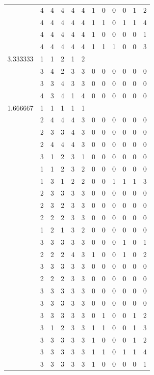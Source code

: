 \documentclass[]{book}
\theoremstyle{definition}
\theoremstyle{definition}
\theoremstyle{definition}
\theoremstyle{remark}
\begin{document}
\begin{table}
{\begin{tabular}[t]{rrrrrrrrrrrr}
 & 4 & 4 & 4 & 4 & 4 & 1 & 0 & 0 & 0 & 1 & 2\\
 & 4 & 4 & 4 & 4 & 4 & 1 & 1 & 0 & 1 & 1 & 4\\
 & 4 & 4 & 4 & 4 & 4 & 1 & 0 & 0 & 0 & 0 & 1\\
 & 4 & 4 & 4 & 4 & 4 & 1 & 1 & 1 & 0 & 0 & 3\\
3.333333 & 1 & 1 & 2 & 1 & 2 &  &  &  &  &  & \\
 & 3 & 4 & 2 & 3 & 3 & 0 & 0 & 0 & 0 & 0 & 0\\
 & 3 & 3 & 4 & 3 & 3 & 0 & 0 & 0 & 0 & 0 & 0\\
 & 4 & 3 & 4 & 1 & 4 & 0 & 0 & 0 & 0 & 0 & 0\\
1.666667 & 1 & 1 & 1 & 1 & 1 &  &  &  &  &  & \\
 & 2 & 4 & 4 & 4 & 3 & 0 & 0 & 0 & 0 & 0 & 0\\
 & 2 & 3 & 3 & 4 & 3 & 0 & 0 & 0 & 0 & 0 & 0\\
 & 2 & 4 & 4 & 4 & 3 & 0 & 0 & 0 & 0 & 0 & 0\\
 & 3 & 1 & 2 & 3 & 1 & 0 & 0 & 0 & 0 & 0 & 0\\
 & 1 & 1 & 2 & 3 & 2 & 0 & 0 & 0 & 0 & 0 & 0\\
 & 1 & 3 & 1 & 2 & 2 & 0 & 0 & 1 & 1 & 1 & 3\\
 & 2 & 3 & 3 & 3 & 3 & 0 & 0 & 0 & 0 & 0 & 0\\
 & 2 & 3 & 2 & 3 & 3 & 0 & 0 & 0 & 0 & 0 & 0\\
 & 2 & 2 & 2 & 3 & 3 & 0 & 0 & 0 & 0 & 0 & 0\\
 & 1 & 2 & 1 & 3 & 2 & 0 & 0 & 0 & 0 & 0 & 0\\
 & 3 & 3 & 3 & 3 & 3 & 0 & 0 & 0 & 1 & 0 & 1\\
 & 2 & 2 & 2 & 4 & 3 & 1 & 0 & 0 & 1 & 0 & 2\\
 & 3 & 3 & 3 & 3 & 3 & 0 & 0 & 0 & 0 & 0 & 0\\
 & 2 & 2 & 2 & 3 & 3 & 0 & 0 & 0 & 0 & 0 & 0\\
 & 3 & 3 & 3 & 3 & 3 & 0 & 0 & 0 & 0 & 0 & 0\\
 & 3 & 3 & 3 & 3 & 3 & 0 & 0 & 0 & 0 & 0 & 0\\
 & 3 & 3 & 3 & 3 & 3 & 0 & 1 & 0 & 0 & 1 & 2\\
 & 3 & 1 & 2 & 3 & 3 & 1 & 1 & 0 & 0 & 1 & 3\\
 & 3 & 3 & 3 & 3 & 3 & 1 & 0 & 0 & 0 & 1 & 2\\
 & 3 & 3 & 3 & 3 & 3 & 1 & 1 & 0 & 1 & 1 & 4\\
 & 3 & 3 & 3 & 3 & 3 & 1 & 0 & 0 & 0 & 0 & 1\\

\end{tabular}}
\end{table}
\end{document}
